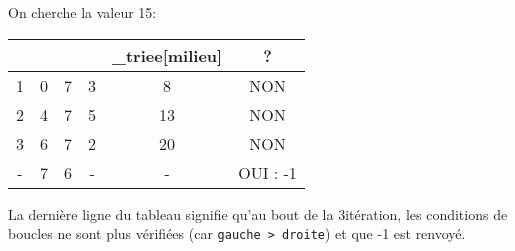 On cherche la valeur 15:
\begin{center}
	\tabularstyled
	\begin{tabular}{|c|c|c|c|c|c|}
		\hline
		\rowcolor{UGLiOrange}{\thsn°itér} & {\thsgauche} & {\thsdroite} & {\thsmilieu} & {\thsliste\_triee[milieu]} & {\thsreturn ?} \\
		\hline
		1                                                  & 0                             & 7                             & 3                             & 8                                           & NON                             \\
		\hline
		2                                                  & 4                             & 7                             & 5                             & 13                                          & NON                             \\
		\hline
		3                                                  & 6                             & 7                             & 2                             & 20                                          & NON                             \\
		\hline
		-                                                  & 7                             & 6                             & -                             & -                                           & OUI : -1                        \\
		\hline
	\end{tabular}
\end{center}
La dernière ligne du tableau signifie qu'au bout de la 3\eme itération, les conditions de boucles ne sont plus vérifiées (car \texttt{gauche > droite}) et que -1 est renvoyé.
